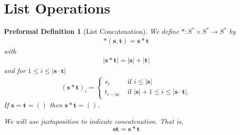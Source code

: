 \documentclass[oneside, 12pt]{book}
\theoremstyle{break}
\newtheorem{preformal definition}[definition]{Preformal Definition}
\newtheorem{preformal theorem}[theorem]{Preformal Theorem}
\newcommand{\bv}[1]{\boldsymbol{#1}}
\newcommand{\norm}[1]{\left|#1\right|}
\begin{document}
		\section{List Operations}
			\begin{preformal definition}[List Concatenation]
				We define $\ast: S^* \times S^* \to S^*$ by
				\begin{align*}
					\ast(\bv{s}, \bv{t}) = \bv{s} \ast \bv{t}
				\end{align*}
				with
				\begin{align*}
					\norm{\bv{s} \ast \bv{t}} = \norm{\bv{s}} + \norm{\bv{t}}
				\end{align*}
				and for $1 \le i \le \norm{\bv{s}\cdot \bv{t}}$
				\begin{align*}
					(\bv{s}\ast \bv{t})_i = \begin{cases}
						s_i &\text{ if } i \le \norm{\bv{s}}\\
						t_{i - \norm{\bv{s}}} &\text{ if } \norm{\bv{s}} + 1 \le i \le \norm{\bv{s}\cdot \bv{t}}.
					\end{cases}
				\end{align*}
				If $\bv{s} = \bv{t} = ()$ then $\bv{s} \ast \bv{t} = ()$.
				
				We will use juxtaposition to indicate concatenation.
				That is,
				\begin{equation*}
					\bv{s}\bv{t} = \bv{s} \ast \bv{t}
				\end{equation*}
			\end{preformal definition}
	
\end{document}
